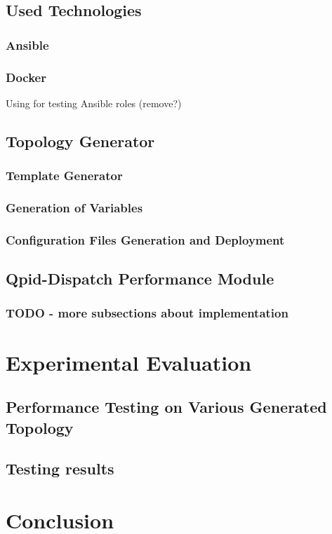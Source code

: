 \section{Used Technologies}

\subsection{Ansible}

\subsection{Docker}
Using for testing Ansible roles (remove?)

\section{Topology Generator}

\subsection{Template Generator}

\subsection{Generation of Variables}

\subsection{Configuration Files Generation and Deployment}

\section{Qpid-Dispatch Performance Module}

\subsection{TODO - more subsections about implementation}

\chapter{Experimental Evaluation}
\label{Experimental Evaluation}

\section{Performance Testing on Various Generated Topology}

\section{Testing results}

\chapter{Conclusion}
\label{Conclusion}
